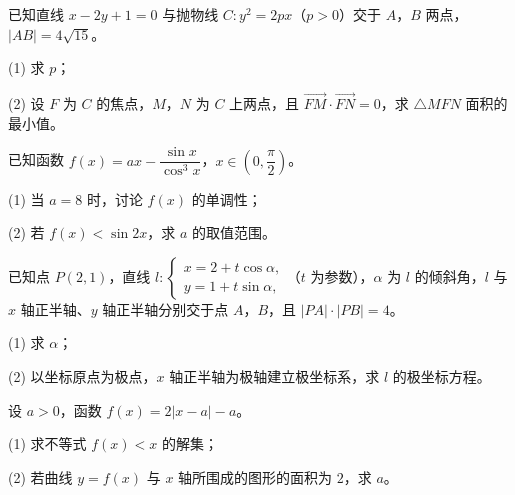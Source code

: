 \begin{question}
已知直线 $x-2y+1=0$ 与抛物线 $C:y^2=2px$（$p>0$）交于 $A$，$B$ 两点，$|AB|=4\sqrt{15}$。

  (1) 求 $p$；

  (2) 设 $F$ 为 $C$ 的焦点，$M$，$N$ 为 $C$ 上两点，且 $\overrightarrow{FM}\cdot\overrightarrow{FN}=0$，求 $\triangle MFN$ 面积的最小值。

\end{question}
\begin{question}
已知函数 $f(x)=ax-\dfrac{\sin x}{\cos^3x}$，$x\in\left(0,\dfrac\pi2\right)$。

  (1) 当 $a=8$ 时，讨论 $f(x)$ 的单调性；

  (2) 若 $f(x)<\sin2x$，求 $a$ 的取值范围。

\end{question}
\begin{question}
已知点 $P(2,1)$，直线 $l:\begin{cases}x=2+t\cos\alpha,\\y=1+t\sin\alpha,\end{cases}$（$t$ 为参数），$\alpha$ 为 $l$ 的倾斜角，$l$ 与 $x$ 轴正半轴、$y$ 轴正半轴分别交于点 $A$，$B$，且 $|PA|\cdot|PB|=4$。

  (1) 求 $\alpha$；

  (2) 以坐标原点为极点，$x$ 轴正半轴为极轴建立极坐标系，求 $l$ 的极坐标方程。

\end{question}
\begin{question}
设 $a>0$，函数 $f(x)=2|x-a|-a$。

  (1) 求不等式 $f(x)<x$ 的解集；

  (2) 若曲线 $y=f(x)$ 与 $x$ 轴所围成的图形的面积为 $2$，求 $a$。

\end{question}